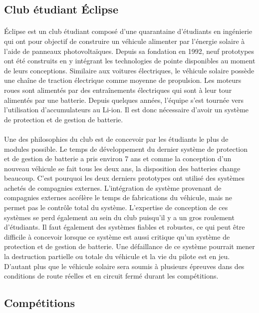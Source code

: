 	\subsection{Club étudiant Éclipse}
	
		\paragraph{}
		Éclipse est un club étudiant composé d'une quarantaine d'étudiants en ingénierie qui ont pour objectif de construire un véhicule alimenter par l'énergie solaire à l'aide de panneaux photovoltaïques. Depuis sa fondation en 1992, neuf prototypes ont été construits en y intégrant les technologies de pointe disponibles au moment de leurs conceptions. Similaire aux voitures électriques, le véhicule solaire possède une chaîne de traction électrique comme moyenne de propulsion. Les moteurs roues sont alimentés par des entraînements électriques qui sont à leur tour alimentés par une batterie. Depuis quelques années, l'équipe s'est tournée vers l'utilisation d'accumulateurs au Li-ion. Il est donc nécessaire d'avoir un système de protection et de gestion de batterie.
		
		\paragraph{}
		Une des philosophies du club est de concevoir par les étudiants le plus de modules possible. Le temps de développement du dernier système de protection et de gestion de batterie a pris environ 7 ans et comme la conception d'un nouveau véhicule se fait tous les deux ans, la disposition des batteries change beaucoup. C'est pourquoi les deux derniers prototypes ont utilisé des systèmes achetés de compagnies externes. L'intégration de système provenant de compagnies externes accélère le temps de fabrications du véhicule, mais ne permet pas le contrôle total du système. L'expertise de conception de ces systèmes se perd également au sein du club puisqu'il y a un gros roulement d'étudiants. Il faut également des systèmes fiables et robustes, ce qui peut être difficile à concevoir lorsque ce système est aussi critique qu'un système de protection et de gestion de batterie. Une défaillance de ce système pourrait mener la destruction partielle ou totale du véhicule et la vie du pilote est en jeu. D'autant plus que le véhicule solaire sera soumis à plusieurs épreuves dans des conditions de route réelles et en circuit fermé durant les compétitions.
	
	\subsection{Compétitions}

